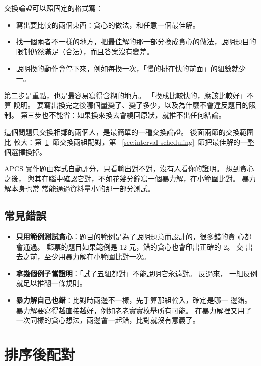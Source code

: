 交換論證可以照固定的格式寫：

\begin{itemize}
\item 寫出要比較的兩個東西：貪心的做法，和任意一個最佳解。
\item 找一個兩者不一樣的地方，把最佳解的那一部分換成貪心的做法，說明題目的
限制仍然滿足（合法），而且答案沒有變差。
\item 說明換的動作會停下來，例如每換一次，「慢的排在快的前面」的組數就少一。
\end{itemize}

第二步是重點，也是最容易寫得含糊的地方。 「換成比較快的，應該比較好」不算
說明。 要寫出換完之後哪個量變了、變了多少，以及為什麼不會違反題目的限制。
第三步也不能省：如果換來換去會繞回原狀，就推不出任何結論。

這個問題只交換相鄰的兩個人，是最簡單的一種交換論證。 後面兩節的交換範圍比
較大：第~\ref{sec:greedy-matching}~節交換兩組配對，第
~\ref{sec:interval-scheduling}~節把最佳解的一整個選擇換掉。

\begin{apcsnote}
APCS 實作題由程式自動評分，只看輸出對不對，沒有人看你的證明。 想到貪心之後，
與其在腦中確認它對，不如花幾分鐘寫一個暴力解，在小範圍比對。 暴力解本身也常
常能通過資料量小的那一部分測試。
\end{apcsnote}

\subsection{常見錯誤}

\begin{itemize}
\item \textbf{只用範例測試貪心}：題目的範例是為了說明題意而設計的，很多錯的貪
心都會通過。 郵票的題目如果範例是 $12$ 元，錯的貪心也會印出正確的 $2$。 交
出去之前，至少用暴力解在小範圍比對一次。
\item \textbf{拿幾個例子當證明}：「試了五組都對」不能說明它永遠對。 反過來，
一組反例就足以推翻一條規則。
\item \textbf{暴力解自己也錯}：比對時兩邊不一樣，先手算那組輸入，確定是哪一
邊錯。 暴力解要寫得越直接越好，例如老老實實枚舉所有可能。 在暴力解裡又用了
一次同樣的貪心想法，兩邊會一起錯，比對就沒有意義了。
\end{itemize}

\section{排序後配對}
\label{sec:greedy-matching}

